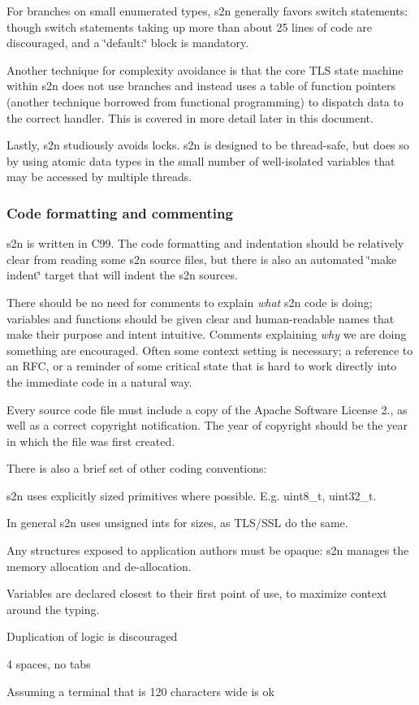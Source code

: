 For branches on small enumerated types, s2n generally favors switch statements\+: though switch statements taking up more than about 25 lines of code are discouraged, and a \char`\"{}default\+:\char`\"{} block is mandatory.

Another technique for complexity avoidance is that the core T\+LS state machine within s2n does not use branches and instead uses a table of function pointers (another technique borrowed from functional programming) to dispatch data to the correct handler. This is covered in more detail later in this document.

Lastly, s2n studiously avoids locks. s2n is designed to be thread-\/safe, but does so by using atomic data types in the small number of well-\/isolated variables that may be accessed by multiple threads.

\subsubsection*{Code formatting and commenting}

s2n is written in C99. The code formatting and indentation should be relatively clear from reading some s2n source files, but there is also an automated \char`\"{}make indent\char`\"{} target that will indent the s2n sources.

There should be no need for comments to explain {\itshape what} s2n code is doing; variables and functions should be given clear and human-\/readable names that make their purpose and intent intuitive. Comments explaining {\itshape why} we are doing something are encouraged. Often some context setting is necessary; a reference to an R\+FC, or a reminder of some critical state that is hard to work directly into the immediate code in a natural way.

Every source code file must include a copy of the Apache Software License 2., as well as a correct copyright notification. The year of copyright should be the year in which the file was first created.

There is also a brief set of other coding conventions\+:


\begin{DoxyItemize}
\item s2n uses explicitly sized primitives where possible. E.\+g. uint8\+\_\+t, uint32\+\_\+t.
\item In general s2n uses unsigned ints for sizes, as T\+L\+S/\+S\+SL do the same.
\item Any structures exposed to application authors must be opaque\+: s2n manages the memory allocation and de-\/allocation.
\item Variables are declared closest to their first point of use, to maximize context around the typing.
\item Duplication of logic is discouraged
\item 4 spaces, no tabs
\item Assuming a terminal that is 120 characters wide is ok
\end{DoxyItemize}

